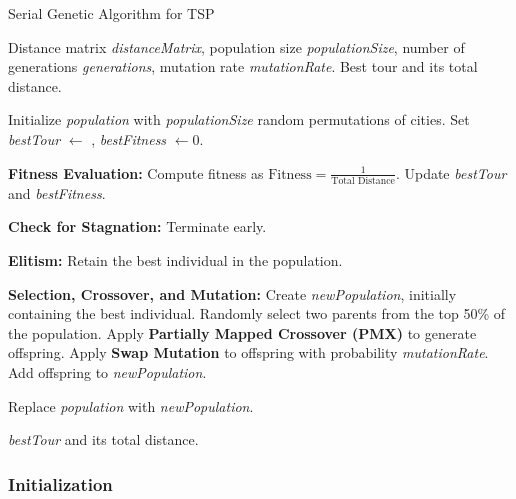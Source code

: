 \documentclass[conference]{IEEEtran}
\begin{document}
\begin{algorithm}
    \caption{Serial Genetic Algorithm for TSP}
    \label{alg:genetic_algorithm}
    \begin{algorithmic}[1]
        \REQUIRE Distance matrix \textit{distanceMatrix}, population size \textit{populationSize}, number of generations \textit{generations}, mutation rate \textit{mutationRate}.
        \ENSURE Best tour and its total distance.

        \STATE Initialize \textit{population} with \textit{populationSize} random permutations of cities.
        \STATE Set \textit{bestTour} $\leftarrow$ , \textit{bestFitness} $\leftarrow 0$.

        \STATE \textbf{Fitness Evaluation:}
        \STATE Compute fitness as $\text{Fitness} = \frac{1}{\text{Total Distance}}$.
        \STATE Update \textit{bestTour} and \textit{bestFitness}.
        \ENDIF
        \ENDFOR

        \STATE \textbf{Check for Stagnation:}
        \STATE Terminate early.
        \ENDIF

        \STATE \textbf{Elitism:} Retain the best individual in the population.

        \STATE \textbf{Selection, Crossover, and Mutation:}
        \STATE Create \textit{newPopulation}, initially containing the best individual.
        \STATE Randomly select two parents from the top 50\% of the population.
        \STATE Apply \textbf{Partially Mapped Crossover (PMX)} to generate offspring.
        \STATE Apply \textbf{Swap Mutation} to offspring with probability \textit{mutationRate}.
        \STATE Add offspring to \textit{newPopulation}.
        \ENDWHILE

        \STATE Replace \textit{population} with \textit{newPopulation}.
        \ENDFOR

        \RETURN \textit{bestTour} and its total distance.
    \end{algorithmic}
\end{algorithm}

\subsubsection{Initialization}
\end{document}
